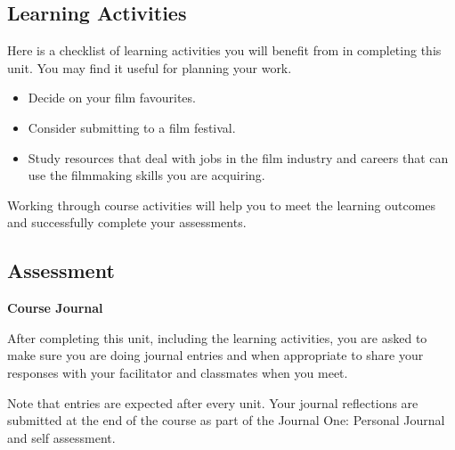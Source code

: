 \documentclass[
  letterpaper,
  DIV=11,
  numbers=noendperiod]{scrreprt}
\providecommand{\tightlist}{%
  \setlength{\itemsep}{0pt}\setlength{\parskip}{0pt}}\usepackage{longtable,booktabs,array}
\begin{document}
\subsection*{Learning Activities}\label{learning-activities-9}

Here is a checklist of learning activities you will benefit from in
completing this unit. You may find it useful for planning your work.

\begin{itemize}
\tightlist
\item
  Decide on your film favourites.
\item
  Consider submitting to a film festival.
\item
  Study resources that deal with jobs in the film industry and careers
  that can use the filmmaking skills you are acquiring.
\end{itemize}

\begin{tcolorbox}[enhanced jigsaw, opacityback=0, colframe=quarto-callout-note-color-frame, leftrule=.75mm, colback=white, toprule=.15mm, breakable, arc=.35mm, rightrule=.15mm, bottomrule=.15mm, left=2mm]
\begin{minipage}[t]{5.5mm}
\textcolor{quarto-callout-note-color}{\faInfo}
\end{minipage}%
\begin{minipage}[t]{\textwidth - 5.5mm}

Working through course activities will help you to meet the learning
outcomes and successfully complete your assessments.

\end{minipage}%
\end{tcolorbox}

\subsection*{Assessment}\label{assessment-9}

\textbf{Course Journal}

After completing this unit, including the learning activities, you are
asked to make sure you are doing journal entries and when appropriate to
share your responses with your facilitator and classmates when you meet.

Note that entries are expected after every unit. Your journal
reflections are submitted at the end of the course as part of the
Journal One: Personal Journal and self assessment.
\end{document}
